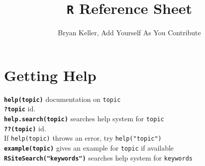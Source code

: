 \documentclass{article}
\title{\texttt{R} Reference Sheet}
\author{Bryan Keller, Add Yourself As You Contribute}
\newcommand{\bt}[1]{\textbf{\texttt{#1}}} %
\newcommand{\pt}[1]{\texttt{#1}}          %
\begin{document}
\maketitle

\section{Getting Help}
\bt{help(topic)} documentation on \pt{topic} \\
\bt{?topic} id. \\
\bt{help.search(topic)} searches help system for \pt{topic} \\
\bt{??(topic)} id. \\
If \pt{help(topic)} throws an error, try \pt{help("topic")} \\
\bt{example(topic)} gives an example for \pt{topic} if available \\
\bt{RSiteSearch("keywords")} searches help system for \pt{keywords} \\
\end{document}
